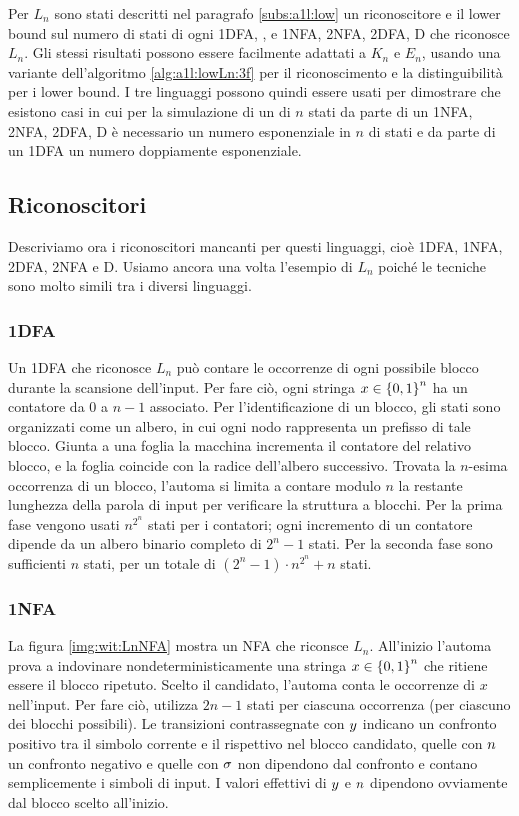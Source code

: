 Per $L_n$ sono stati descritti nel paragrafo \ref{subs:a1l:low} un  riconoscitore e il lower bound sul numero di stati di ogni 1DFA, , e 1NFA, 2NFA, 2DFA, D che riconosce $L_n$. Gli stessi risultati possono essere facilmente adattati a $K_n$ e $E_n$, usando una variante dell'algoritmo \ref{alg:a1l:lowLn:3f} per il riconoscimento e la distinguibilità per i lower bound.
I tre linguaggi possono quindi essere usati per dimostrare che esistono casi in cui per la simulazione di un  di $n$ stati da parte di un 1NFA, 2NFA, 2DFA, D è necessario un numero esponenziale in $n$ di stati e da parte di un 1DFA un numero doppiamente esponenziale.


\subsection{Riconoscitori}
Descriviamo ora i riconoscitori mancanti per questi linguaggi, cioè 1DFA, 1NFA, 2DFA, 2NFA e D. Usiamo ancora una volta l'esempio di $L_n$ poiché le tecniche sono molto simili tra i diversi linguaggi.

\subsubsection{1DFA}
Un 1DFA che riconosce $L_n$ può contare le occorrenze di ogni possibile blocco durante la scansione dell'input. Per fare ciò, ogni stringa $x\in\left\{ 0,1 \right\}^n$ ha un contatore da $0$ a $n-1$ associato. Per l'identificazione di un blocco, gli stati sono organizzati come un albero, in cui ogni nodo rappresenta un prefisso di tale blocco. Giunta a una foglia la macchina incrementa il contatore del relativo blocco, e la foglia coincide con la radice dell'albero successivo. Trovata la $n$-esima occorrenza di un blocco, l'automa si limita a contare modulo $n$ la restante lunghezza della parola di input per verificare la struttura a blocchi. Per la prima fase vengono usati $n^{2^n}$ stati per i contatori; ogni incremento di un contatore dipende da un albero binario completo di $2^n-1$ stati. Per la seconda fase sono sufficienti $n$ stati, per un totale di $(2^n-1)\cdot n^{2^n}+n$ stati.

\subsubsection{1NFA}
La figura \ref{img:wit:LnNFA} mostra un NFA che riconsce $L_n$. All'inizio l'automa prova a indovinare nondeterministicamente una stringa $x\in\left\{ 0,1 \right\}^n$ che ritiene essere il blocco ripetuto. Scelto il candidato, l'automa conta le occorrenze di $x$ nell'input. Per fare ciò, utilizza $2n-1$ stati per ciascuna occorrenza (per ciascuno dei blocchi possibili). Le transizioni contrassegnate con $y$ indicano un confronto positivo tra il simbolo corrente e il rispettivo nel blocco candidato, quelle con $n$ un confronto negativo e quelle con $\sigma$ non dipendono dal confronto e contano semplicemente i simboli di input. I valori effettivi di $y$ e $n$ dipendono ovviamente dal blocco scelto all'inizio.

